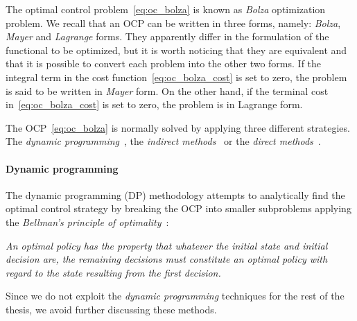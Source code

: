 The optimal control problem~\eqref{eq:oc_bolza} is known as \emph{Bolza} optimization problem.  We recall that an OCP can be written in three forms, namely: \emph{Bolza}, \emph{Mayer} and \emph{Lagrange} forms.   
They apparently differ in the formulation of the functional to be optimized, but it is worth noticing that they are equivalent and that it is possible to convert each problem into the other two forms.
If the integral term in the cost function~\eqref{eq:oc_bolza_cost} is set to zero, the problem is said to be written in \emph{Mayer} form. On the other hand, if the terminal cost in~\eqref{eq:oc_bolza_cost} is set to zero, the problem is in Lagrange form. \par
The OCP~\eqref{eq:oc_bolza} is normally solved by applying three different strategies. The \emph{dynamic programming}~\citep{Bellman1952OnProgramming,Tawiah2021OptimalProgramming}, the \emph{indirect methods}~\citep{Liberzon2012CalculusTheory,Bertolazzi2005SymbolicNumericSystems,Pontriagin1962TheProcesses} or the \emph{direct methods}~\citep{BettsPractical2010}.


\paragraph{Dynamic programming}
The dynamic programming (DP) methodology attempts to analytically find the optimal control strategy by breaking the OCP into smaller subproblems applying the \emph{Bellman's principle of optimality}~\citep{Gross2016OnOptimality,Bellman1952OnProgramming,Dreyfus2002RichardProgramming}:
\begin{center}
\begin{minipage}{12cm}
   \emph{An optimal policy has the property that whatever the initial state and initial decision are, the remaining decisions must constitute an optimal policy with regard to the state resulting from the first decision.}
\end{minipage}
\end{center}
Since we do not exploit the \emph{dynamic programming} techniques for the rest of the thesis, we avoid further discussing these methods.
